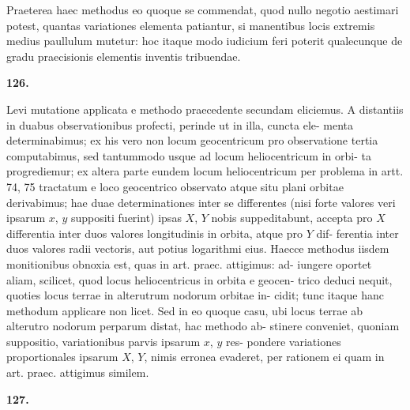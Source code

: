 \documentclass[12pt,a4paper]{article}
\begin{document}
Praeterea haec methodus eo quoque se commendat, quod nullo negotio
aestimari potest, quantas variationes elementa patiantur, si manentibus locis
extremis medius paullulum mutetur: hoc itaque modo iudicium feri poterit
qualecunque de gradu praecisionis elementis inventis tribuendae.


\bigskip
\noindent\textbf{126.}

Levi mutatione applicata e methodo praecedente secundam eliciemus. A
distantiis in duabus observationibus profecti, perinde ut in illa, cuncta ele-
menta determinabimus; ex his vero non locum geocentricum pro observatione
tertia computabimus, sed tantummodo usque ad locum heliocentricum in orbi-
ta progrediemur; ex altera parte eundem locum heliocentricum per problema
in artt. 74, 75 tractatum e loco geocentrico observato atque situ plani orbitae
derivabimus; hae duae determinationes inter se differentes (nisi forte valores
veri ipsarum $x$, $y$ suppositi fuerint) ipsas $X$, $Y$ nobis suppeditabunt, accepta
pro $X$ differentia inter duos valores longitudinis in orbita, atque pro $Y$ dif-
ferentia inter duos valores radii vectoris, aut potius logarithmi eius. Haecce
methodus iisdem monitionibus obnoxia est, quas in art. praec. attigimus: ad-
iungere oportet aliam, scilicet, quod locus heliocentricus in orbita e geocen-
trico deduci nequit, quoties locus terrae in alterutrum nodorum orbitae in-
cidit; tunc itaque hanc methodum applicare non licet. Sed in eo quoque
casu, ubi locus terrae ab alterutro nodorum perparum distat, hac methodo ab-
stinere conveniet, quoniam suppositio, variationibus parvis ipsarum $x$, $y$ res-
pondere variationes proportionales ipsarum $X$, $Y$, nimis erronea evaderet, per
rationem ei quam in art. praec. attigimus similem.

\bigskip
\noindent\textbf{127.}
\end{document}
